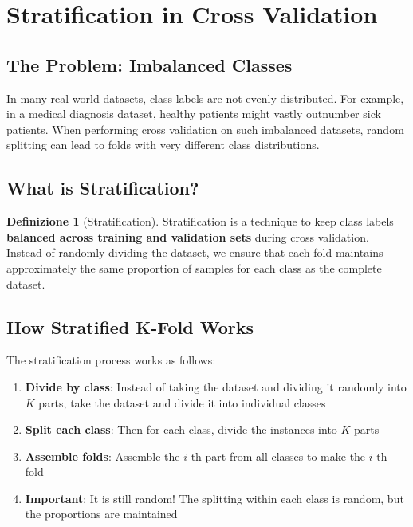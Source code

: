 \documentclass[11pt,a4paper]{article}
\theoremstyle{definition}
\newtheorem{definition}{Definizione}[section]
\theoremstyle{plain}
\theoremstyle{remark}
\begin{document}
\section{Stratification in Cross Validation}

\subsection{The Problem: Imbalanced Classes}

In many real-world datasets, class labels are not evenly distributed. For example, in a medical diagnosis dataset, healthy patients might vastly outnumber sick patients. When performing cross validation on such imbalanced datasets, random splitting can lead to folds with very different class distributions.

\subsection{What is Stratification?}

\begin{definition}[Stratification]
Stratification is a technique to keep class labels \textbf{balanced across training and validation sets} during cross validation. Instead of randomly dividing the dataset, we ensure that each fold maintains approximately the same proportion of samples for each class as the complete dataset.
\end{definition}

\subsection{How Stratified K-Fold Works}

The stratification process works as follows:

\begin{enumerate}
    \item \textbf{Divide by class}: Instead of taking the dataset and dividing it randomly into $K$ parts, take the dataset and divide it into individual classes
    
    \item \textbf{Split each class}: Then for each class, divide the instances into $K$ parts
    
    \item \textbf{Assemble folds}: Assemble the $i$-th part from all classes to make the $i$-th fold
    
    \item \textbf{Important}: It is still random! The splitting within each class is random, but the proportions are maintained
\end{enumerate}
\end{document}
